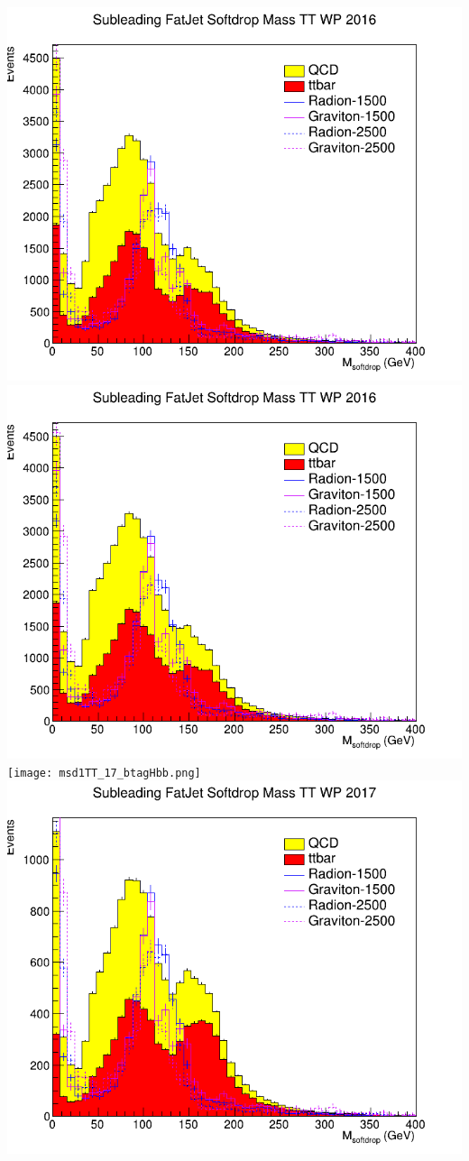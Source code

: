 \includegraphics[width=1\textwidth]{msd1TT_16_btagHbb.png}
\includegraphics[width=1\textwidth]{msd1TT_16_deepTagMD_HbbvsQCD.png}
\texttt{[image: msd1TT\_17\_btagHbb.png]}
\includegraphics[width=1\textwidth]{msd1TT_17_deepTagMD_HbbvsQCD.png}
